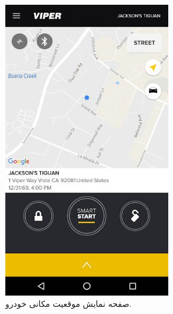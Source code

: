 \documentclass[a4paper,12pt]{report}
\begin{document}
\begin{figure}[!h]
\begin{subfigure}[t]{0.3\linewidth}
			\includegraphics[width=0.8\textwidth]{images/viper_smart_start_1.jpg}
			\caption{
				صفحه نمایش موقعیت مکانی خودرو.
			}
			\label{subfig3:fig1:sec3:chap1}
		\end{subfigure}
		\hspace*{1cm}
		\begin{subfigure}[t]{0.3\linewidth}
			\centering

\end{subfigure}
\end{figure}
\end{document}
